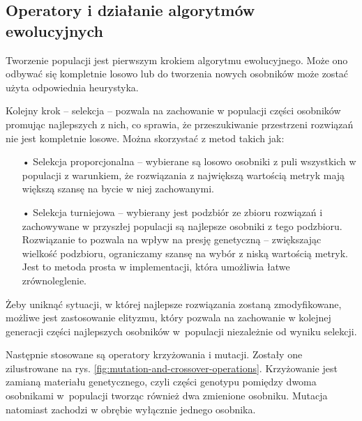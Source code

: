 \subsection{Operatory i działanie algorytmów ewolucyjnych}
Tworzenie populacji jest pierwszym krokiem algorytmu ewolucyjnego. Może ono odbywać się kompletnie losowo lub do tworzenia nowych osobników może zostać użyta odpowiednia heurystyka. 

Kolejny krok -- selekcja -- pozwala na zachowanie w populacji części osobników promując najlepszych z nich, co sprawia, że przeszukiwanie przestrzeni rozwiązań nie jest kompletnie losowe. Można skorzystać z metod takich jak:
\begin{itemize}
  \item[•] Selekcja proporcjonalna -- wybierane są losowo osobniki z puli wszystkich w populacji z warunkiem, że rozwiązania z największą wartością metryk mają większą szansę na bycie w niej zachowanymi. 
  \item[•] Selekcja turniejowa -- wybierany jest podzbiór ze zbioru rozwiązań i zachowywane w przyszłej populacji są najlepsze osobniki z tego podzbioru. Rozwiązanie to pozwala na wpływ na presję genetyczną -- zwiększając wielkość podzbioru, ograniczamy szansę na wybór z niską wartością metryk. Jest to metoda prosta w implementacji, która umożliwia łatwe zrównoleglenie.
\end{itemize}

Żeby uniknąć sytuacji, w której najlepsze rozwiązania zostaną zmodyfikowane, możliwe jest zastosowanie elityzmu, który pozwala na zachowanie w kolejnej generacji części najlepszych osobników w~populacji niezależnie od wyniku selekcji.

Następnie stosowane są operatory krzyżowania i mutacji. Zostały one zilustrowane na rys. \ref{fig:mutation-and-crossover-operations}. Krzyżowanie jest zamianą materiału genetycznego, czyli części genotypu pomiędzy dwoma osobnikami w~populacji tworząc również dwa zmienione osobniku. Mutacja natomiast zachodzi w obrębie wyłącznie jednego osobnika.

